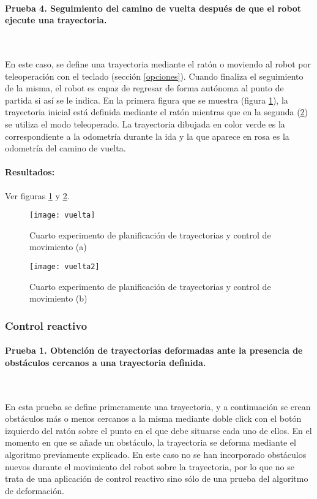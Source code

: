 \clearpage
\paragraph{Prueba 4. Seguimiento del camino de vuelta después de que el robot ejecute una trayectoria.}\ %

\noindent
En este caso, se define una trayectoria mediante el ratón o moviendo al robot por teleoperación con el teclado (sección \ref{opciones}). Cuando finaliza el seguimiento de la misma, el robot es capaz de regresar de forma autónoma al punto de partida si así se le indica. En la primera figura que se muestra (figura \ref{fg:mov4a}), la trayectoria inicial está definida mediante el ratón mientras que en la segunda (\ref{fg:mov4b}) se utiliza el modo teleoperado. La trayectoria dibujada en color verde es la correspondiente a la odometría durante la ida y la que aparece en rosa es la odometría del camino de vuelta.

\paragraph{Resultados:} Ver figuras \ref{fg:mov4a} y \ref{fg:mov4b}.

\begin{figure}[h]
  \centering\texttt{[image: vuelta]}\\
 \caption{Cuarto experimento de planificación de trayectorias y control de movimiento (a)}\label{fg:mov4a}
\end{figure}

\begin{figure}[h]
\centering\texttt{[image: vuelta2]}
  \caption{Cuarto experimento de planificación de trayectorias y control de movimiento (b)}\label{fg:mov4b}
\end{figure}

\clearpage

\subsubsection{Control reactivo}

\paragraph{Prueba 1. Obtención de trayectorias deformadas ante la presencia de obstáculos cercanos a una trayectoria definida.}\ %

\noindent
En esta prueba se define primeramente una trayectoria, y a continuación se crean obstáculos más o menos cercanos a la misma mediante doble click con el botón izquierdo del ratón sobre el punto en el que debe situarse cada uno de ellos. En el momento en que se añade un obstáculo, la trayectoria se deforma mediante el algoritmo previamente explicado. En este caso no se han incorporado obstáculos nuevos durante el movimiento del robot sobre la trayectoria, por lo que no se trata de una aplicación de control reactivo sino sólo de una prueba del algoritmo de deformación.


